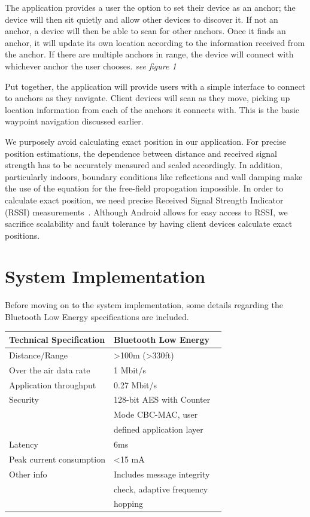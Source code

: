 \documentclass{sig-alternate}
\begin{document}
The application provides a user the option to set their device
as an anchor; the device will then sit quietly and allow
other devices to discover it. If not an anchor, a device will 
then be able to scan for other anchors. Once it finds an 
anchor, it will update its own location according to the information
received from the anchor. If there are multiple anchors in range,
the device will connect with whichever anchor the user chooses.
\textit{see figure 1}

Put together, the application will provide users with a simple
interface to connect to anchors as they navigate. Client devices
will scan as they move, picking up location information from each
of the anchors it connects with. This is the basic waypoint navigation
discussed earlier. 

We purposely avoid calculating exact position in our application.
For precise position estimations, the dependence between distance
and received signal strength has to be accurately measured and scaled
accordingly. In addition, particularly indoors, boundary conditions like
reflections and wall damping make the use of the equation for
the free-field propogation impossible. In order to calculate 
exact position, we need precise Received Signal Strength
Indicator (RSSI) measurements~\cite{feldman}. Although Android
allows for easy access to RSSI, we sacrifice scalability and fault
tolerance by having client devices calculate exact positions.

\section{System Implementation}
\label{sec:sys_implement}
Before moving on to the system implementation, some details 
regarding the Bluetooth Low Energy specifications are included. 

\begin{table}[h!]
    \begin{tabular}{ll}
    Technical Specification  & Bluetooth Low Energy ~\cite{bluetooth_core} \\ \hline
    Distance/Range           & >100m (>330ft)              \\
    Over the air data rate   & 1 Mbit/s                          \\
    Application throughput   & 0.27 Mbit/s                    \\
    Security                 & 128-bit AES with Counter     \\ 
			        & Mode CBC-MAC, user         \\
			        & defined application layer      \\
    Latency                  & 6ms                                       \\
    Peak current consumption & <15 mA                     \\
    Other info               & Includes message integrity   \\ 
			        & check, adaptive frequency    \\
			        & hopping 
    \end{tabular}
\end{table}
\end{document}
